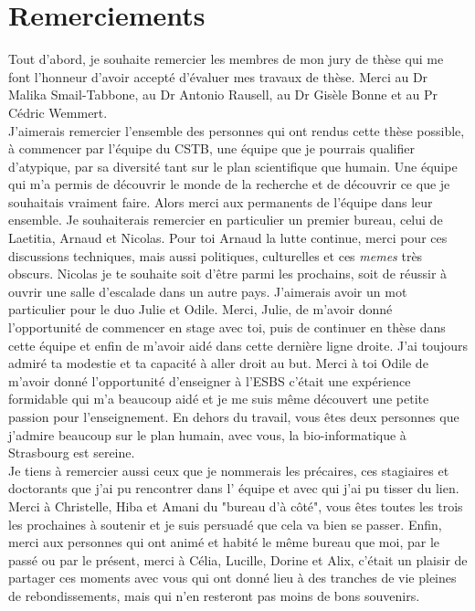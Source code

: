 \chapter{Remerciements}
Tout d'abord, je souhaite remercier les membres de mon jury de thèse qui me font l'honneur d'avoir accepté d'évaluer mes travaux de thèse. Merci au Dr Malika Smail-Tabbone, au Dr Antonio Rausell, au Dr Gisèle Bonne et au Pr Cédric Wemmert. \\

J'aimerais remercier l'ensemble des personnes qui ont rendus cette thèse possible, à commencer par l'équipe du CSTB, une équipe que je pourrais qualifier d'atypique, par sa diversité tant sur le plan scientifique que humain. Une équipe qui m'a permis de découvrir le monde de la recherche et de découvrir ce que je souhaitais vraiment faire. Alors merci aux permanents de l'équipe dans leur ensemble. Je souhaiterais remercier en particulier un premier bureau, celui de Laetitia, Arnaud et Nicolas. Pour toi Arnaud la lutte continue, merci pour ces discussions techniques, mais aussi politiques, culturelles et ces \textit{memes} très obscurs. Nicolas je te souhaite soit d'être parmi les prochains, soit de réussir à ouvrir une salle d'escalade dans un autre pays. 
J'aimerais avoir un mot particulier pour le duo Julie et Odile. Merci, Julie, de m'avoir donné l'opportunité de commencer en stage avec toi, puis de continuer en thèse dans cette équipe et enfin de m'avoir aidé dans cette dernière ligne droite. J'ai toujours admiré ta modestie et ta capacité à aller droit au but. Merci à toi Odile de m'avoir donné l'opportunité d'enseigner à l'ESBS c'était une expérience formidable qui m'a beaucoup aidé et je me suis même découvert une petite passion pour l'enseignement. En dehors du travail, vous êtes deux personnes que j'admire beaucoup sur le plan humain, avec vous, la bio-informatique à Strasbourg est sereine. \\

Je tiens à remercier aussi ceux que je nommerais les précaires, ces stagiaires et doctorants que j'ai pu rencontrer dans l' équipe et avec qui j'ai pu tisser du lien. Merci à Christelle, Hiba et Amani du "bureau d'à côté", vous êtes toutes les trois les prochaines à soutenir et je suis persuadé que cela va bien se passer. Enfin, merci aux personnes qui ont animé et habité le même bureau que moi, par le passé ou par le présent, merci à Célia, Lucille, Dorine et Alix, c'était un plaisir de partager ces moments avec vous qui ont donné lieu à des tranches de vie pleines de rebondissements, mais qui n'en resteront pas moins de bons souvenirs. \\

